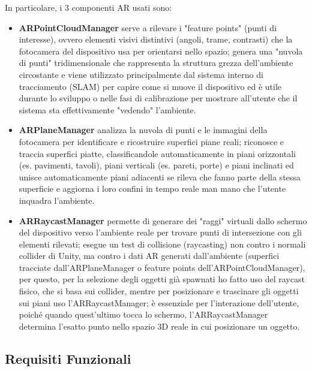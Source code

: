 In particolare, i 3 componenti AR usati sono: 
\begin{itemize}

    \item \textbf{ARPointCloudManager} serve a rilevare i "feature points" (punti di interesse), ovvero elementi visivi distintivi (angoli, trame, contrasti) che la fotocamera del dispositivo usa per orientarsi nello spazio; genera una "nuvola di punti" tridimensionale che rappresenta la struttura grezza dell'ambiente circostante e viene utilizzato principalmente dal sistema interno di tracciamento (SLAM) per capire come si muove il dispositivo ed è utile durante lo sviluppo o nelle fasi di calibrazione per mostrare all'utente che il sistema sta effettivamente "vedendo" l'ambiente.
    
    \item \textbf{ARPlaneManager} analizza la nuvola di punti e le immagini della fotocamera per identificare e ricostruire superfici piane reali; riconosce e traccia superfici piatte, classificandole automaticamente in piani orizzontali (es. pavimenti, tavoli), piani verticali (es. pareti, porte) e piani inclinati ed unisce automaticamente piani adiacenti se rileva che fanno parte della stessa superficie e aggiorna i loro confini in tempo reale man mano che l'utente inquadra l'ambiente. 

    \item \textbf{ARRaycastManager} permette di generare dei "raggi" virtuali dallo schermo del dispositivo verso l'ambiente reale per trovare punti di intersezione con gli elementi rilevati; esegue un test di collisione (raycasting) non contro i normali collider di Unity, ma contro i dati AR generati dall'ambiente (superfici tracciate dall'ARPlaneManager o feature points dell'ARPointCloudManager), per questo, per la selezione degli oggetti già spawnati ho fatto uso del raycast fisico, che si basa sui collider, mentre per posizionare e trascinare gli oggetti sui piani uso l’ARRaycastManager; è essenziale per l’interazione dell’utente, poiché quando quest’ultimo tocca lo schermo, l’ARRaycastManager determina l’esatto punto nello spazio 3D reale in cui posizionare un oggetto.

\end{itemize}


\subsection{Requisiti Funzionali}

